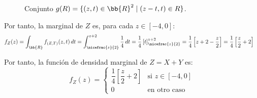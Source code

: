 \documentclass[12pt]{article}
\begin{document}
\begin{ejercicio}
\begin{enumerate}
\begin{figure}[H]
                \caption{Conjunto $g(R)=\{(z,t)\in \bb{R}^2\mid (z-t,t)\in R\}$.}
                \label{fig:conjuntoZT}
            \end{figure}

            Por tanto, la marginal de $Z$ es, para cada $z\in \left[-4, 0\right]$:
            \begin{align*}
                f_Z(z) &= \int_{\bb{R}} f_{(Z,T)}(z, t) \, dt = \int_{\nicefrac{z}{2}}^{z+2} \dfrac{1}{4} \, dt = \dfrac{1}{4}\left[t\right]_{\nicefrac{z}{2}}^{z+2} = \dfrac{1}{4}\left[z+2-\dfrac{z}{2}\right] = \dfrac{1}{4}\left[\dfrac{z}{2}+2\right]
            \end{align*}

            Por tanto, la función de densidad marginal de $Z=X+Y$ es:
            \begin{equation*}
                f_Z(z) = \begin{cases}
                    \dfrac{1}{4}\left[\dfrac{z}{2}+2\right] & \text{si } z\in \left[-4, 0\right]\\
                    0 & \text{en otro caso}
                \end{cases}
            \end{equation*}
        \end{enumerate}
    \end{ejercicio}
\end{document}
